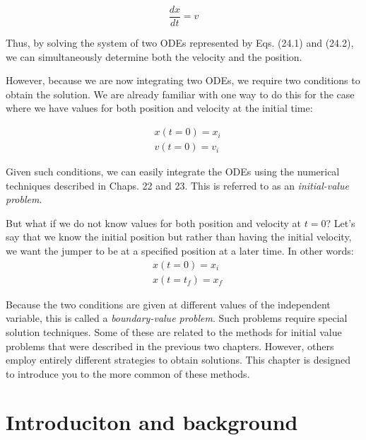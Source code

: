 \documentclass[../main.tex]{subfiles}
\begin{document}
\begin{equation}
    \tag{24.2}
    \frac{dx}{dt} = v
\end{equation}

\noindent Thus, by solving the system of two ODEs represented by Eqs. (24.1) and (24.2), we can
simultaneously determine both the velocity and the position.

However, because we are now integrating two ODEs, we require two conditions to
obtain the solution. We are already familiar with one way to do this for the case where we
have values for both position and velocity at the initial time:

\begin{equation} \nonumber
    \begin{aligned}
    &x(t=0)=x_{i} \\
    &v(t=0)=v_{i}
    \end{aligned}
\end{equation}

\noindent Given such conditions, we can easily integrate the ODEs using the numerical techniques
described in Chaps. 22 and 23. This is referred to as an \textit{initial-value problem}.

But what if we do not know values for both position and velocity at $t = 0$? Let's say
that we know the initial position but rather than having the initial velocity, we want the
jumper to be at a specified position at a later time. In other words:
\begin{equation} \nonumber
    \begin{aligned}
        &x(t=0) = x_i \\
        &x(t=t_f) = x_f
    \end{aligned}
\end{equation}

\noindent Because the two conditions are given at different values of the independent variable, this is called a \textit{boundary-value problem}.
Such problems require special solution techniques. Some of these are related to the
methods for initial value problems that were described in the previous two chapters. However, others employ entirely different strategies to obtain solutions. This chapter is designed to introduce you to the more common of these methods.\vspace{2cm}

\section{Introduciton and background}
\end{document}
